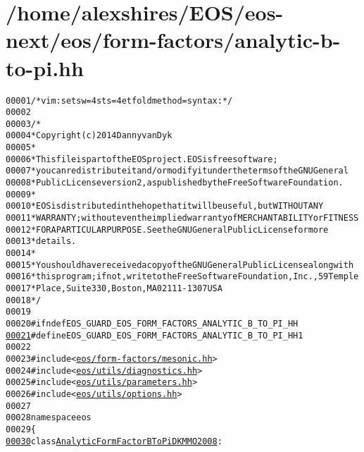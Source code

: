 \hypertarget{analytic-b-to-pi_8hh_source}{
\section{/home/alexshires/EOS/eos-\/next/eos/form-\/factors/analytic-\/b-\/to-\/pi.hh}
}


\begin{footnotesize}\begin{alltt}
00001 \textcolor{comment}{/* vim: set sw=4 sts=4 et foldmethod=syntax : */}
00002 
00003 \textcolor{comment}{/*}
00004 \textcolor{comment}{ * Copyright (c) 2014 Danny van Dyk}
00005 \textcolor{comment}{ *}
00006 \textcolor{comment}{ * This file is part of the EOS project. EOS is free software;}
00007 \textcolor{comment}{ * you can redistribute it and/or modify it under the terms of the GNU General}
00008 \textcolor{comment}{ * Public License version 2, as published by the Free Software Foundation.}
00009 \textcolor{comment}{ *}
00010 \textcolor{comment}{ * EOS is distributed in the hope that it will be useful, but WITHOUT ANY}
00011 \textcolor{comment}{ * WARRANTY; without even the implied warranty of MERCHANTABILITY or FITNESS}
00012 \textcolor{comment}{ * FOR A PARTICULAR PURPOSE.  See the GNU General Public License for more}
00013 \textcolor{comment}{ * details.}
00014 \textcolor{comment}{ *}
00015 \textcolor{comment}{ * You should have received a copy of the GNU General Public License along with}
00016 \textcolor{comment}{ * this program; if not, write to the Free Software Foundation, Inc., 59 Temple}
00017 \textcolor{comment}{ * Place, Suite 330, Boston, MA  02111-1307  USA}
00018 \textcolor{comment}{ */}
00019 
00020 \textcolor{preprocessor}{#ifndef EOS\_GUARD\_EOS\_FORM\_FACTORS\_ANALYTIC\_B\_TO\_PI\_HH}
\hypertarget{analytic-b-to-pi_8hh_source_l00021}{}\hyperlink{analytic-b-to-pi_8hh_a2cbc4c680b544546e7a23f8c3738fe53}{00021} \textcolor{preprocessor}{}\textcolor{preprocessor}{#define EOS\_GUARD\_EOS\_FORM\_FACTORS\_ANALYTIC\_B\_TO\_PI\_HH 1}
00022 \textcolor{preprocessor}{}
00023 \textcolor{preprocessor}{#include <\hyperlink{mesonic_8hh}{eos/form-factors/mesonic.hh}>}
00024 \textcolor{preprocessor}{#include <\hyperlink{diagnostics_8hh}{eos/utils/diagnostics.hh}>}
00025 \textcolor{preprocessor}{#include <\hyperlink{parameters_8hh}{eos/utils/parameters.hh}>}
00026 \textcolor{preprocessor}{#include <\hyperlink{options_8hh}{eos/utils/options.hh}>}
00027 
00028 \textcolor{keyword}{namespace }eos
00029 \{
\hypertarget{analytic-b-to-pi_8hh_source_l00030}{}\hyperlink{classeos_1_1AnalyticFormFactorBToPiDKMMO2008}{00030}     \textcolor{keyword}{class }\hyperlink{classeos_1_1AnalyticFormFactorBToPiDKMMO2008}{AnalyticFormFactorBToPiDKMMO2008} :

\end{alltt}
\end{footnotesize}
